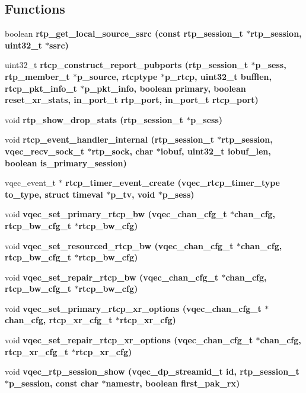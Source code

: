 \subsection*{Functions}
\begin{CompactItemize}
\item 
boolean \bf{rtp\_\-get\_\-local\_\-source\_\-ssrc} (const rtp\_\-session\_\-t $\ast$rtp\_\-session, uint32\_\-t $\ast$ssrc)
\item 
uint32\_\-t \bf{rtcp\_\-construct\_\-report\_\-pubports} (rtp\_\-session\_\-t $\ast$p\_\-sess, rtp\_\-member\_\-t $\ast$p\_\-source, rtcptype $\ast$p\_\-rtcp, uint32\_\-t bufflen, rtcp\_\-pkt\_\-info\_\-t $\ast$p\_\-pkt\_\-info, boolean primary, boolean reset\_\-xr\_\-stats, in\_\-port\_\-t rtp\_\-port, in\_\-port\_\-t rtcp\_\-port)
\item 
void \bf{rtp\_\-show\_\-drop\_\-stats} (rtp\_\-session\_\-t $\ast$p\_\-sess)
\item 
void \bf{rtcp\_\-event\_\-handler\_\-internal} (rtp\_\-session\_\-t $\ast$rtp\_\-session, vqec\_\-recv\_\-sock\_\-t $\ast$rtp\_\-sock, char $\ast$iobuf, uint32\_\-t iobuf\_\-len, boolean is\_\-primary\_\-session)
\item 
vqec\_\-event\_\-t $\ast$ \bf{rtcp\_\-timer\_\-event\_\-create} (\bf{vqec\_\-rtcp\_\-timer\_\-type} to\_\-type, struct timeval $\ast$p\_\-tv, void $\ast$p\_\-sess)
\item 
void \bf{vqec\_\-set\_\-primary\_\-rtcp\_\-bw} (\bf{vqec\_\-chan\_\-cfg\_\-t} $\ast$chan\_\-cfg, rtcp\_\-bw\_\-cfg\_\-t $\ast$rtcp\_\-bw\_\-cfg)
\item 
void \bf{vqec\_\-set\_\-resourced\_\-rtcp\_\-bw} (\bf{vqec\_\-chan\_\-cfg\_\-t} $\ast$chan\_\-cfg, rtcp\_\-bw\_\-cfg\_\-t $\ast$rtcp\_\-bw\_\-cfg)
\item 
void \bf{vqec\_\-set\_\-repair\_\-rtcp\_\-bw} (\bf{vqec\_\-chan\_\-cfg\_\-t} $\ast$chan\_\-cfg, rtcp\_\-bw\_\-cfg\_\-t $\ast$rtcp\_\-bw\_\-cfg)
\item 
void \bf{vqec\_\-set\_\-primary\_\-rtcp\_\-xr\_\-options} (\bf{vqec\_\-chan\_\-cfg\_\-t} $\ast$chan\_\-cfg, rtcp\_\-xr\_\-cfg\_\-t $\ast$rtcp\_\-xr\_\-cfg)
\item 
void \bf{vqec\_\-set\_\-repair\_\-rtcp\_\-xr\_\-options} (\bf{vqec\_\-chan\_\-cfg\_\-t} $\ast$chan\_\-cfg, rtcp\_\-xr\_\-cfg\_\-t $\ast$rtcp\_\-xr\_\-cfg)
\item 
void \bf{vqec\_\-rtp\_\-session\_\-show} (vqec\_\-dp\_\-streamid\_\-t id, rtp\_\-session\_\-t $\ast$p\_\-session, const char $\ast$namestr, boolean first\_\-pak\_\-rx)
\item 

\end{CompactItemize}

